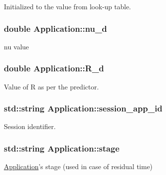 Initialized to the value from look-\/up table. 

\hypertarget{classApplication_a42c22b9a3130cf1f2722ce222f2e5bae}{
\subsubsection[{nu\-\_\-d}]{\setlength{\rightskip}{0pt plus 5cm}double Application\-::nu\-\_\-d}}\label{classApplication_a42c22b9a3130cf1f2722ce222f2e5bae}


nu value 

\hypertarget{classApplication_a374d43f68ae27aaed98278e8152a434c}{
\subsubsection[{R\-\_\-d}]{\setlength{\rightskip}{0pt plus 5cm}double Application\-::\-R\-\_\-d}}\label{classApplication_a374d43f68ae27aaed98278e8152a434c}


Value of R as per the predictor. 

\hypertarget{classApplication_a5e28ffadb86925ecae57ab18c0085d90}{
\subsubsection[{session\-\_\-app\-\_\-id}]{\setlength{\rightskip}{0pt plus 5cm}std\-::string Application\-::session\-\_\-app\-\_\-id}}\label{classApplication_a5e28ffadb86925ecae57ab18c0085d90}


Session identifier. 

\hypertarget{classApplication_adb1cba2c06695bfdf81482dfba449d5b}{
\subsubsection[{stage}]{\setlength{\rightskip}{0pt plus 5cm}std\-::string Application\-::stage}}\label{classApplication_adb1cba2c06695bfdf81482dfba449d5b}


\hyperlink{classApplication}{Application}'s stage (used in case of residual time) 

